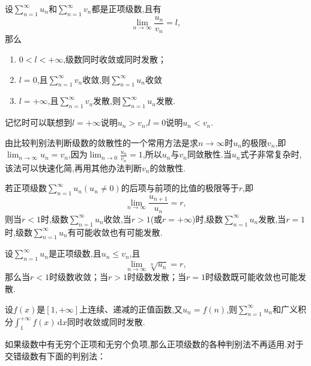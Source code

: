 \begin{ttheorem}[（比较判别法的极限形式）]
    设$\sum^{\infty}_{n=1} u_n$和$\sum^{\infty}_{n=1} v_n$都是正项级数,且有
    \begin{equation*}
        \lim_{n \to \infty} \frac{u_n}{v_n}=l,
    \end{equation*}
    那么
    \begin{enumerate}
        \item $0<l<+\infty$,级数同时收敛或同时发散；
        \item $l=0$,且$\sum^{\infty}_{n=1} v_n$收敛,则$\sum^{\infty}_{n=1} u_n$收敛
        \item $l=+\infty$,且$\sum^{\infty}_{n=1} v_n$发散,则$\sum^{\infty}_{n=1} u_n$发散.
    \end{enumerate}
    记忆时可以联想到$l=+\infty$说明$u_n>v_n$,$l=0$说明$u_n<v_n$.

    由比较判别法判断级数的敛散性的一个常用方法是求$n \to \infty$时$u_n$的极限$v_n$,即$\lim_{n \to \infty} u_n=v_n$,因为$\lim_{n \to 0}\frac{u_n}{v_n}=1$,所以$u_n$与$v_n$同敛散性.当$u_n$式子非常复杂时,该法可以快速化简,再用其他办法判断$v_n$的敛散性.
\end{ttheorem}
\begin{ttheorem}[（D'Alembert判别法）]
    若正项级数$\sum^{\infty}_{n=1} u_n(u_n \neq 0)$的后项与前项的比值的极限等于$r$,即
    \begin{equation*}
        \lim_{n \to \infty} \frac{u_{n+1}}{u_n}=r,
    \end{equation*}
    则当$r<1$时,级数$\sum^{\infty}_{n=1} u_n$收敛,当$r>1$(或$r=+\infty$)时,级数$\sum^{\infty}_{n=1} u_n$发散,当$r=1$时,级数$\sum^{\infty}_{n=1} u_n$有可能收敛也有可能发散.
\end{ttheorem}
\begin{ttheorem}[（Cauchy判别法）]
    设$\sum^{\infty}_{n=1} u_n$是正项级数,且$u_n \leqslant v_n $,且
    \begin{equation*}
        \lim_{n \to \infty} \sqrt[n]{u_n}=r,
    \end{equation*}
    那么当$r<1$时级数收敛；当$r>1$时级数发散；当$r=1$时级数既可能收敛也可能发散.
\end{ttheorem}
\begin{ttheorem}[（积分判别法）]
    设$f(x)$是$[1,+\infty]$上连续、递减的正值函数,又$u_n=f(n)$,则$\sum^{\infty}_{n=1} u_n$和广义积分$\int_{1}^{+\infty} f(x) \,\mathrm{d}x $同时收敛或同时发散.
\end{ttheorem}
如果级数中有无穷个正项和无穷个负项,那么正项级数的各种判别法不再适用.对于交错级数有下面的判别法：
